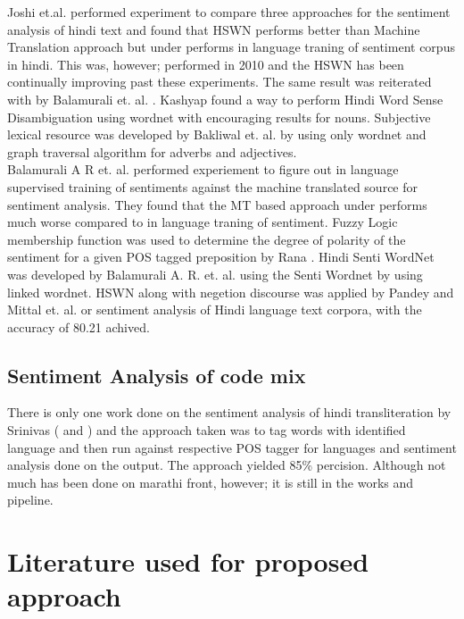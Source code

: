 \documentclass[12pt]{book}
\begin{document}
Joshi et.al. \cite{joshi_fall-back_2010} performed experiment to compare three
approaches for the sentiment analysis of hindi text and found that HSWN
performs better than Machine Translation approach but under performs in
language traning of sentiment corpus in hindi. This was, however; performed in
2010 and the HSWN has been continually improving past these experiments. The
same result was reiterated with by Balamurali et. al.
\cite{hutchison_lost_2013}. Kashyap \cite{kashyap_hindi_????} found a way to
perform Hindi Word Sense Disambiguation using wordnet with encouraging results
for nouns. Subjective lexical resource was developed by Bakliwal et. al.
\cite{bakliwal_hindi_2012} by using only wordnet and graph traversal algorithm
for adverbs and adjectives.\\

Balamurali A R et. al. \cite{balamurali_a_r_cross-lingual_????} performed
experiement to figure out in language supervised training of sentiments against
the machine translated source for sentiment analysis. They found that the MT
based approach under performs much worse compared to in language traning of
sentiment. Fuzzy Logic membership function was used to determine the degree of
polarity of the sentiment for a given POS tagged preposition by Rana
\cite{shweta_rana_sentiment_2014}. Hindi Senti WordNet was developed by
Balamurali A. R. et. al. \cite{balamurali_a_r_cross-lingual_????} using the Senti Wordnet by using linked wordnet. HSWN along with negetion discourse was applied by Pandey
\cite{pandey_framework_2015} and Mittal et. al. \cite{mittal_sentiment_2013} or
sentiment analysis of Hindi language text corpora, with the accuracy of 80.21
achived. \\

\subsection{Sentiment Analysis of code mix}
There is only one work done on the sentiment analysis of hindi transliteration
by Srinivas (\cite{sharma_text_2015} and \cite{shashank_sharma_sentiment_????}
) and the approach taken was to tag words with identified language and then run
against respective POS tagger for languages and sentiment analysis done on the
output. The approach yielded 85\% percision. Although not much has been done on
marathi front, however; it is still in the works and pipeline.\\

\section{Literature used for proposed approach}
\end{document}
